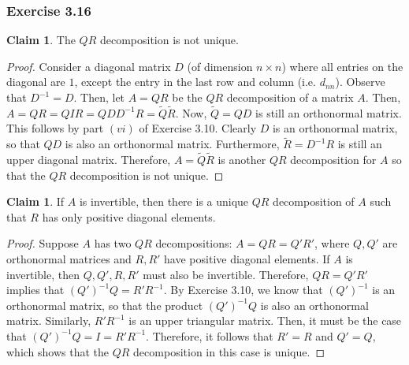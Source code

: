 \documentclass[letterpaper,12pt]{article}
\theoremstyle{definition}
\newtheorem{claim}[theorem]{Claim}
\begin{document}
\subsubsection*{Exercise 3.16}
\begin{claim}
	The $QR$ decomposition is not unique. 
\end{claim}
\begin{proof}
	Consider a diagonal matrix $D$ (of dimension $n\times n$) where all entries on the diagonal are $1$, except the entry in the last row and column (i.e. $d_{nn}$). Observe that $D^{-1} = D$. Then, let $A =  QR$ be the $QR$ decomposition of a matrix $A$. Then, $A = QR = QIR = QDD^{-1}R = \tilde{Q} \tilde{R}$. Now, $\tilde{Q} = QD$ is still an orthonormal matrix. This follows by part $(vi)$ of Exercise 3.10. Clearly $D$ is an orthonormal matrix, so that $QD$ is also an orthonormal matrix. Furthermore, $\tilde{R} = D^{-1}R$ is still an upper diagonal matrix. Therefore, $A = \tilde{Q} \tilde{R}$ is another $QR$ decomposition for $A$ so that the $QR$ decomposition is not unique.
\end{proof}

\begin{claim}
	If $A$ is invertible, then there is a unique $QR$ decomposition of $A$ such that $R$ has only positive diagonal elements. 
\end{claim}
\begin{proof}
	Suppose $A$ has two $QR$ decompositions: $A = QR = Q'R'$, where $Q, Q'$ are orthonormal matrices and $R, R'$ have positive diagonal elements. If $A$ is invertible, then $Q,Q', R, R'$ must also be invertible. Therefore, $QR = Q'R'$ implies that $(Q')^{-1}Q = R' R^{-1}$. By Exercise 3.10, we know that $(Q')^{-1}$ is an orthonormal matrix, so that the product $(Q')^{-1}Q$ is also an orthonormal matrix. Similarly, $R' R^{-1}$ is an upper triangular matrix. Then, it must be the case that $(Q')^{-1}Q = I = R' R^{-1}$. Therefore, it follows that $R' = R$ and $Q' = Q$, which shows that the $QR$ decomposition in this case is unique.
\end{proof}
\end{document}

